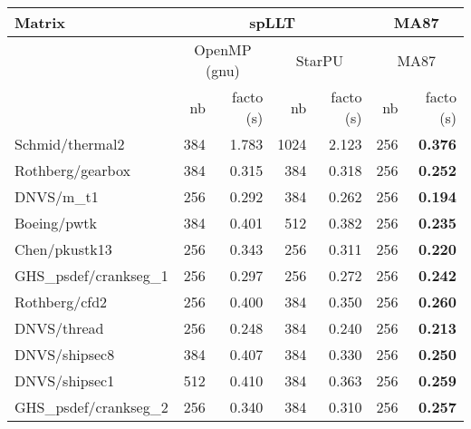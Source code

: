 \begin{tabular}{l|rr|rr|rr}
  \hline
  Matrix                          & \multicolumn{4}{c}{spLLT}        & \multicolumn{2}{c}{MA87}                                         \\
  \hline
                                  & \multicolumn{2}{c}{OpenMP (gnu)} & \multicolumn{2}{c}{StarPU} & \multicolumn{2}{c}{MA87}            \\ 
  \cline{2-7}
                                  & nb                               & facto (s)                  & nb   & facto (s) & nb  & facto (s)  \\
  \hline
  Schmid/thermal2                 & 384                              & 1.783                      & 1024 & 2.123     & 256 & \bf 0.376  \\
  Rothberg/gearbox                & 384                              & 0.315                      & 384  & 0.318     & 256 & \bf 0.252  \\
  DNVS/m\_t1                      & 256                              & 0.292                      & 384  & 0.262     & 256 & \bf 0.194  \\
  Boeing/pwtk                     & 384                              & 0.401                      & 512  & 0.382     & 256 & \bf 0.235  \\
  Chen/pkustk13                   & 256                              & 0.343                      & 256  & 0.311     & 256 & \bf 0.220  \\
  GHS\_psdef/crankseg\_1          & 256                              & 0.297                      & 256  & 0.272     & 256 & \bf 0.242  \\
  Rothberg/cfd2                   & 256                              & 0.400                      & 384  & 0.350     & 256 & \bf 0.260  \\
  DNVS/thread                     & 256                              & 0.248                      & 384  & 0.240     & 256 & \bf 0.213  \\
  DNVS/shipsec8                   & 384                              & 0.407                      & 384  & 0.330     & 256 & \bf 0.250  \\
  DNVS/shipsec1                   & 512                              & 0.410                      & 384  & 0.363     & 256 & \bf 0.259  \\
  GHS\_psdef/crankseg\_2          & 256                              & 0.340                      & 384  & 0.310     & 256 & \bf 0.257  \\

\end{tabular}
